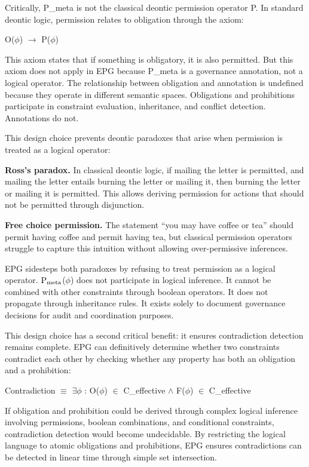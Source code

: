 Critically, P\_\allowbreak{}meta is not the classical deontic permission operator P. In standard deontic logic, permission relates to obligation through the axiom:

\begin{claddisp}
O($\phi$) $\to$ P($\phi$)
\end{claddisp}


This axiom states that if something is obligatory, it is also permitted. But this axiom does not apply in EPG because P\_\allowbreak{}meta is a governance annotation, not a logical operator. The relationship between obligation and annotation is undefined because they operate in different semantic spaces. Obligations and prohibitions participate in constraint evaluation, inheritance, and conflict detection. Annotations do not.

This design choice prevents deontic paradoxes that arise when permission is treated as a logical operator:

\textbf{Ross's paradox.} In classical deontic logic, if mailing the letter is permitted, and mailing the letter entails burning the letter or mailing it, then burning the letter or mailing it is permitted. This allows deriving permission for actions that should not be permitted through disjunction.

\textbf{Free choice permission.} The statement ``you may have coffee or tea'' should permit having coffee and permit having tea, but classical permission operators struggle to capture this intuition without allowing over-permissive inferences.

EPG sidesteps both paradoxes by refusing to treat permission as a logical operator. $\mathrm{P_{meta}}$($\phi$) does not participate in logical inference. It cannot be combined with other constraints through boolean operators. It does not propagate through inheritance rules. It exists solely to document governance decisions for audit and coordination purposes.

This design choice has a second critical benefit: it ensures contradiction detection remains complete. EPG can definitively determine whether two constraints contradict each other by checking whether any property has both an obligation and a prohibition:

\begin{claddisp}
Contradiction $\equiv$ $\exists$$\phi$ : O($\phi$) $\in$ C\_effective $\wedge$ F($\phi$) $\in$ C\_effective
\end{claddisp}


If obligation and prohibition could be derived through complex logical inference involving permissions, boolean combinations, and conditional constraints, contradiction detection would become undecidable. By restricting the logical language to atomic obligations and prohibitions, EPG ensures contradictions can be detected in linear time through simple set intersection.

